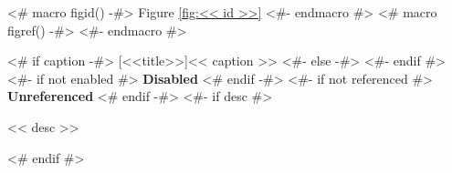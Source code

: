 <# macro figid() -#>
Figure \ref{fig:<< id >>}
<#- endmacro #>
<# macro figref() -#>
\color{light-gray}
<#- endmacro #>

\begin{samepage}
\nopagebreak
{}
<# if caption -#>
\nopagebreak
{}[<<title>>]{<< caption >>}
<#- else -#>
<#- endif #>\label{fig:<< id >>}
<#- if not enabled #>
{\color{red}\textbf{Disabled}}
<# endif -#>
<#- if not referenced #>
{\color{red}\textbf{Unreferenced}}
<# endif -#>
<#- if desc #>
\nopagebreak
\begin{figinfo}<< desc >>\end{figinfo}
<# endif #>
\end{samepage}
\pagebreak
